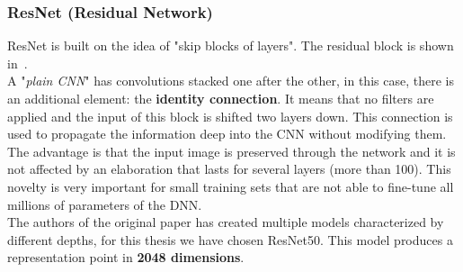 \subsubsection*{ResNet (Residual Network)}
ResNet\cite{resNet_paper} is built on the idea of "skip blocks of layers". The residual block is shown in~.\\
A "\textit{plain CNN}" has convolutions stacked one after the other, in this case, there is an additional element: the \textbf{identity connection}. It means that no filters are applied and the input of this block is shifted two layers down. This connection is used to propagate the information deep into the CNN without modifying them. The advantage is that the input image is preserved through the network and it is not affected by an elaboration that lasts for several layers (more than 100). This novelty is very important for small training sets that are not able to fine-tune all millions of parameters of the DNN.\\
The authors of the original paper has created multiple models characterized by different depths, for this thesis we have chosen ResNet50\cite{resNet_model}. This model produces a representation point in \textbf{2048 dimensions}.

